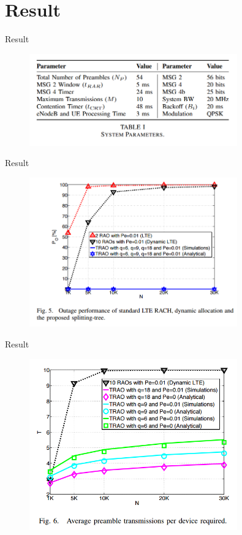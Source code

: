 \documentclass{beamer}
\begin{document}
\section{Result}
\begin{frame}{Result}
    \begin{figure}[t]
        \centering
        \includegraphics[width=0.8\textwidth]{figures/t.png}
    \end{figure}
\end{frame}
\begin{frame}{Result}
    \begin{figure}[t]
        \centering
        \includegraphics[width=0.8\textwidth]{figures/e.png}
    \end{figure}
\end{frame}
\begin{frame}{Result}
    \begin{figure}[t]
        \centering
        \includegraphics[width=0.8\textwidth]{figures/f.png}
    \end{figure}
\end{frame}
\end{document}
